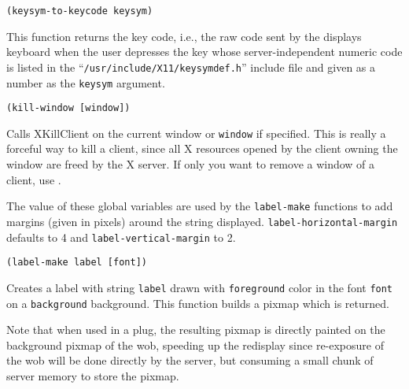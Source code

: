 {\usagefont\begin{verbatim}
(keysym-to-keycode keysym)
\end{verbatim}}\usageupspace

This function returns the key code, i.e., the raw code sent by the displays
keyboard when the user depresses the key whose server-independent numeric
code is listed in the ``\verb"/usr/include/X11/keysymdef.h"'' include file
and given as a number as the \verb"keysym" argument.

        
{\usagefont\begin{verbatim}
(kill-window [window])
\end{verbatim}}\usageupspace

Calls XKillClient on the current window or \verb"window" if specified. This is
really a forceful way to kill a client, since all X resources opened by the
client owning the window are freed by the X server. If only you want to
remove a window of a client, use .

        

The value of these global variables are used by the \verb"label-make"
functions to add margins (given in pixels) around the string displayed.
\verb"label-horizontal-margin" defaults to 4 and
\verb"label-vertical-margin" to 2.

        
{\usagefont\begin{verbatim}
(label-make label [font])
\end{verbatim}}\usageupspace

Creates a label with string \verb"label" drawn with \verb"foreground" color
in the font \verb"font" on a \verb"background" background. This function
builds a pixmap which is returned. 

Note that when used in a plug, the resulting pixmap is directly painted on
the background pixmap of the wob, speeding up the redisplay  since
re-exposure of the wob will be done directly by the server, but consuming a
small chunk of server memory to store the pixmap.


